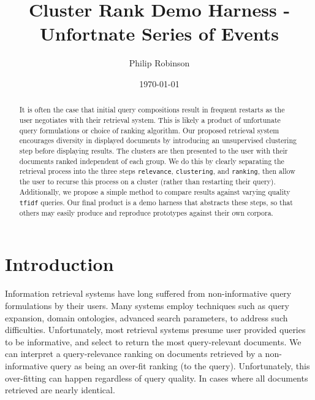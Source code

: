 \documentclass[11pt]{article}
\title{Cluster Rank Demo Harness - Unfortnate Series of Events}
\date{\today}
\author{Philip Robinson}
\affil{Oregon Health Sciences University}
\def\tfidf{\texttt{tfidf}\xspace}
\begin{document}
\maketitle
{}
\begin{abstract}
  It is often the case that initial query compositions result in frequent restarts as
  the user negotiates with their retrieval system. This is likely a product of unfortunate
  query formulations or choice of ranking algorithm. Our proposed retrieval system
  encourages diversity in displayed documents by introducing an unsupervised clustering
  step before displaying results. The clusters are then presented to the user with their
  documents ranked independent of each group. We do this by clearly separating the
  retrieval process into the three steps \texttt{relevance}, \texttt{clustering}, and
  \texttt{ranking}, then allow the user to recurse this process on a cluster (rather
  than restarting their query). Additionally, we propose a simple method to
  compare results against varying quality \tfidf queries. Our final product is a demo
  harness that abstracts these steps, so that others may easily produce and reproduce
  prototypes against their own corpora.
\end{abstract}

\section{Introduction}
Information retrieval systems have long suffered from non-informative query formulations
by their users. Many systems employ techniques such as query expansion, domain ontologies,
advanced search parameters, to address such difficulties. Unfortunately, most retrieval
systems presume user provided queries to be informative, and select to return the most
query-relevant documents. We can interpret a query-relevance ranking on documents retrieved
by a non-informative query as being an over-fit ranking (to the query). Unfortunately, this
over-fitting can happen regardless of query quality. In cases where all documents retrieved
are nearly identical.
\end{document}
